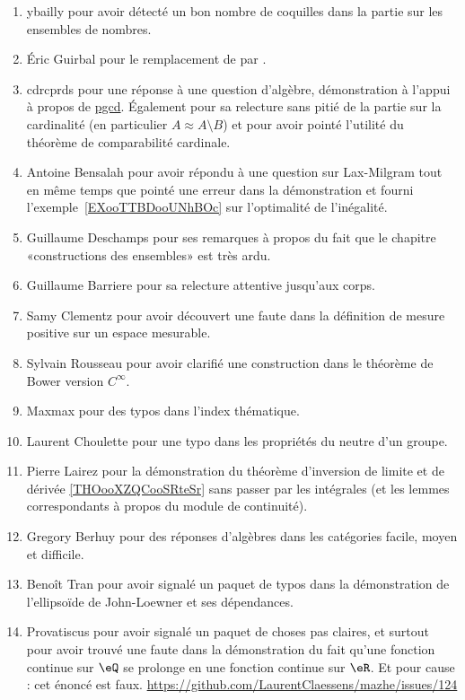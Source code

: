 \begin{enumerate}
    \item
        ybailly pour avoir détecté un bon nombre de coquilles dans la partie sur les ensembles de nombres.
    \item
        Éric Guirbal pour le remplacement de  par .
    \item
        cdrcprds pour une réponse à une question d'algèbre, démonstration à l'appui à propos de \href{https://github.com/LaurentClaessens/mazhe/issues/52#issuecomment-333251728}{pgcd}. Également pour sa relecture sans pitié de la partie sur la cardinalité (en particulier \( A\approx A\setminus B\)) et pour avoir pointé l'utilité du théorème de comparabilité cardinale.
    \item
        Antoine Bensalah pour avoir répondu à une question sur Lax-Milgram tout en même temps que pointé une erreur dans la démonstration et fourni l'exemple~\ref{EXooTTBDooUNhBOc} sur l'optimalité de l'inégalité.
    \item
        Guillaume Deschamps pour ses remarques à propos du fait que le chapitre «constructions des ensembles» est très ardu.
    \item
        Guillaume Barriere pour sa relecture attentive jusqu'aux corps.
    \item
        Samy Clementz pour avoir découvert une faute dans la définition de mesure positive sur un espace mesurable.
    \item
        Sylvain Rousseau pour avoir clarifié une construction dans le théorème de Bower version \(  C^{\infty}\).
    \item
        Maxmax pour des typos dans l'index thématique.
    \item
        Laurent Choulette pour une typo dans les propriétés du neutre d'un groupe.
    \item
        Pierre Lairez pour la démonstration du théorème d'inversion de limite et de dérivée \ref{THOooXZQCooSRteSr} sans passer par les intégrales (et les lemmes correspondants à propos du module de continuité).
    \item
        Gregory Berhuy pour des réponses d'algèbres dans les catégories facile, moyen et difficile.
    \item
        Benoît Tran pour avoir signalé un paquet de typos dans la démonstration de l'ellipsoïde de John-Loewner et ses dépendances.
    \item
        Provatiscus pour avoir signalé un paquet de choses pas claires, et surtout pour avoir trouvé une faute dans la démonstration du fait qu'une fonction continue sur \( \eQ\) se prolonge en une fonction continue sur \( \eR\). Et pour cause : cet énoncé est faux. \url{https://github.com/LaurentClaessens/mazhe/issues/124}

\end{enumerate}
